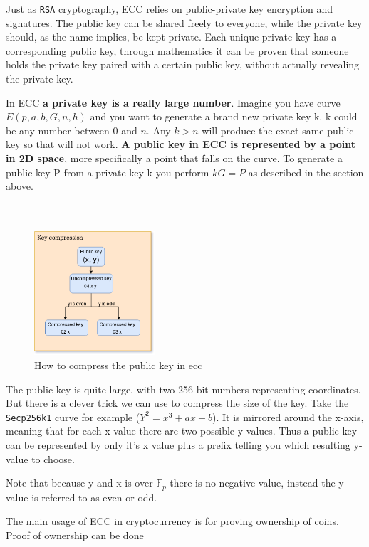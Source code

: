 Just as \texttt{RSA} cryptography, ECC relies on public-private key encryption and signatures. The public key can be shared freely to everyone, while the private key should, as the name implies, be kept private. Each unique private key has a corresponding public key, through mathematics it can be proven that someone holds the private key paired with a certain public key, without actually revealing the private key. 

In ECC \textbf{a private key is a really large number}. Imagine you have curve $E(p,a,b,G,n,h)$ and you want to generate a brand new private key k. k could be any number between 0 and $n$. Any $k > n$ will produce the exact same public key so that will not work. \textbf{A public key in ECC is represented by a point in 2D space}, more specifically a point that falls on the curve. To generate a public key P from a private key k you perform $kG = P$ as described in the section above.\\\\\\

\begin{figure}
	\begin{center}
		\includegraphics[width=0.4\textwidth]{background/images/key_compression.png}
	\end{center}
	\caption{How to compress the public key in ecc}
\end{figure}

The public key is quite large, with two 256-bit numbers representing coordinates. But there is a clever trick we can use to compress the size of the key. Take the \texttt{Secp256k1} curve for example ($Y^2=x^3+ax+b$). It is mirrored around the x-axis, meaning that for each x value there are two possible y values. Thus a public key can be represented by only it's x value plus a prefix telling you which resulting y-value to choose. 

Note that because y and x is over $\mathbb{F}_{p}$ there is no negative value, instead the y value is referred to as even or odd. 

The main usage of ECC in cryptocurrency is for proving ownership of coins. Proof of ownership can be done 
